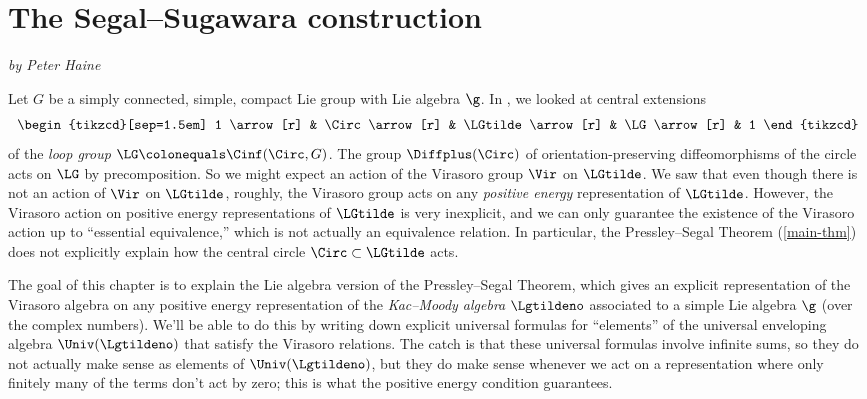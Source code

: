 

\section{The Segal--Sugawara construction}
\textit{by Peter Haine}
\label{segal_sugawara}

Let $ G $ be a simply connected, simple, compact Lie group with Lie algebra $ \g $.
In , we looked at central extensions
\begin{equation*}
	\begin{tikzcd}[sep=1.5em]
		1 \arrow[r] & \Circ \arrow[r] & \LGtilde \arrow[r] & \LG \arrow[r] & 1
	\end{tikzcd}
\end{equation*}
of the \textit{loop group} $ \LG \colonequals \Cinf(\Circ,G) $.
The group $ \Diffplus(\Circ) $ of orientation-preserving diffeomorphisms of the circle acts on $ \LG $ by precomposition.
So we might expect an action of the Virasoro group $ \Vir $ on $ \LGtilde $.
We saw that even though there is not an action of $ \Vir $ on $ \LGtilde $, roughly, the Virasoro group acts on any \textit{positive energy} representation of $ \LGtilde $.
However, the Virasoro action on positive energy representations of $ \LGtilde $ is very inexplicit, and we can
only guarantee the existence of the Virasoro action up to ``essential equivalence,'' which is not actually an
equivalence relation.
In particular, the Pressley--Segal Theorem \cite[Theorem 13.4.3]{loop} (\cref{main-thm}) does not explicitly
explain how the central circle $ \Circ \subset \LGtilde $ acts.

The goal of this chapter is to explain the Lie algebra version of the Pressley--Segal Theorem, which gives an
explicit representation of the Virasoro algebra on any positive energy representation of the \textit{Kac--Moody
algebra} $ \Lgtildeno $ associated to a simple Lie algebra $ \g $ (over the complex numbers).  We'll be able to do
this by writing down explicit universal formulas for ``elements'' of the universal enveloping algebra $
\Univ(\Lgtildeno) $ that satisfy the Virasoro relations.  The catch is that these universal formulas involve
infinite sums, so they do not actually make sense as elements of $ \Univ(\Lgtildeno) $, but they do make sense
whenever we act on a representation where only finitely many of the terms don't act by zero; this is what the
positive energy condition guarantees.




